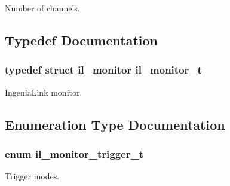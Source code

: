 Number of channels. 



\subsection{Typedef Documentation}
\subsubsection[{\texorpdfstring{il\+\_\+monitor\+\_\+t}{il_monitor_t}}]{\setlength{\rightskip}{0pt plus 5cm}typedef struct il\+\_\+monitor {\bf il\+\_\+monitor\+\_\+t}}\hypertarget{group__IL__MONITOR_ga40e12e851c8c83202f0bccbaaafbc1f3}{}\label{group__IL__MONITOR_ga40e12e851c8c83202f0bccbaaafbc1f3}


Ingenia\+Link monitor. 



\subsection{Enumeration Type Documentation}
\subsubsection[{\texorpdfstring{il\+\_\+monitor\+\_\+trigger\+\_\+t}{il_monitor_trigger_t}}]{\setlength{\rightskip}{0pt plus 5cm}enum {\bf il\+\_\+monitor\+\_\+trigger\+\_\+t}}\hypertarget{group__IL__MONITOR_ga713d0c15082ee67cb77d384d4537e107}{}\label{group__IL__MONITOR_ga713d0c15082ee67cb77d384d4537e107}


Trigger modes. 

